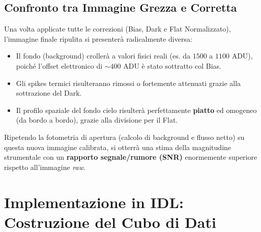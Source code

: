 \subsection{Confronto tra Immagine Grezza e Corretta}
Una volta applicate tutte le correzioni (Bias, Dark e Flat Normalizzato), l'immagine finale ripulita si presenterà radicalmente diversa:
\begin{itemize}
\item Il fondo (background) crollerà a valori fisici reali (es. da $1500$ a $1100 \text{ ADU}$), poiché l'offset elettronico di $\sim 400 \text{ ADU}$ è stato sottratto col Bias.
\item Gli spikes termici risulteranno rimossi o fortemente attenuati grazie alla sottrazione del Dark.
\item Il profilo spaziale del fondo cielo risulterà perfettamente \textbf{piatto} ed omogeneo (da bordo a bordo), grazie alla divisione per il Flat.
\end{itemize}
Ripetendo la fotometria di apertura (calcolo di background e flusso netto) su questa nuova immagine calibrata, si otterrà una stima della magnitudine strumentale con un \textbf{rapporto segnale/rumore (SNR)} enormemente superiore rispetto all'immagine \textit{raw}.

\section{Implementazione in IDL: Costruzione del Cubo di Dati}

